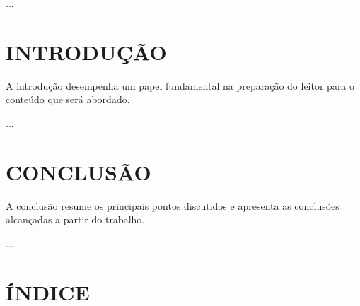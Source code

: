 ...

\chapter{INTRODUÇÃO}

A introdução desempenha um papel fundamental na preparação do leitor para o conteúdo que será abordado.

...

\chapter{CONCLUSÃO}

A conclusão resume os principais pontos discutidos e apresenta as conclusões alcançadas a partir do trabalho.

...

\chapter*{ÍNDICE}

\printindex


